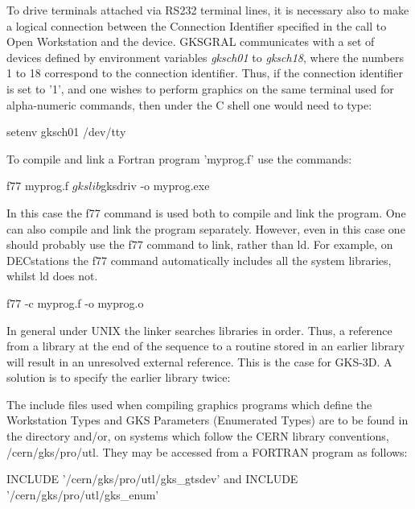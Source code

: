 To drive terminals attached via RS232 terminal lines, it is necessary
also to make a logical connection between the Connection Identifier
specified in the call to Open Workstation and the device.
GKSGRAL communicates with a set of devices defined by environment
variables {\it gksch01} to {\it gksch18}, where the numbers
1 to 18 correspond to the connection identifier. Thus, if the
connection identifier is set to '1', and one wishes to perform graphics
on the same terminal used for alpha-numeric commands, then under
the C shell one would need to type:
\begin{XMP}
setenv gksch01   /dev/tty
\end{XMP}
 
To compile and link a Fortran program 'myprog.f' use the commands:
\begin{XMP}
f77 myprog.f $gkslib $gksdriv -o myprog.exe
\end{XMP}
In this case the f77 command is used both to compile and link the
program. One can also compile and link the program separately.
However, even in this case one should probably use the f77 command to
link, rather than ld. For example, on DECstations the f77 command
automatically includes all the system libraries, whilst ld does not.
\begin{XMP}
f77 -c myprog.f -o myprog.o
\end{XMP}
\begin{note}
In general under UNIX the linker searches libraries in order.
Thus, a reference from a library at the end of the sequence to a routine
stored in an earlier library will result in an unresolved external
reference. This is the case for GKS-3D. A solution is to specify
the earlier library twice:
\end{note}
 
The include files used when compiling graphics programs which
define the Workstation Types and GKS Parameters (Enumerated Types)
are to be found in the directory 
 and/or, on systems which
follow the CERN library conventions, /cern/gks/pro/utl.
They may be accessed from a FORTRAN program as follows:
\begin{XMP}
      INCLUDE '/cern/gks/pro/utl/gks_gtsdev'
       and
      INCLUDE '/cern/gks/pro/utl/gks_enum'
\end{XMP}
 
